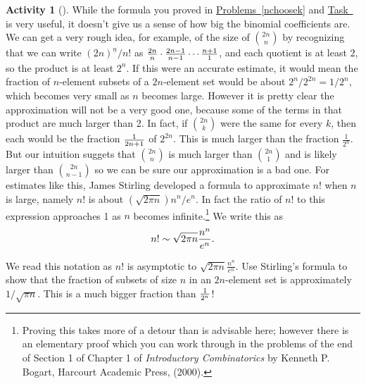 \documentclass[10pt,]{book}
\theoremstyle{plain}
\theoremstyle{definition}
\newtheorem{activity}[project]{Activity}
\numberwithin{equation}{chapter}
\begin{document}
\begin{activity}[]\label{Stirling_sapproximation}
While the formula you proved in \hyperref[nchoosek]{Problems~\ref{nchoosek}} and \hyperref[formulanchoosekfinal]{Task~} is very useful, it doesn't give us a sense of how big the binomial coefficients are. We can get a very rough idea, for example, of the size of \(2n\choose n\) by recognizing that we can write \((2n)^{\underline{n}}/n!\) as \({2n\over n}\cdot
{2n-1\over n-1}\cdots {n+1\over 1}\), and each quotient is at least \(2\), so the product is at least \(2^n\). If this were an accurate estimate, it would mean the fraction of \(n\)-element subsets of a \(2n\)-element set would be about \(2^n/2^{2n}=1/2^n\), which becomes very small as \(n\) becomes large. However it is pretty clear the approximation will not be a very good one, because some of the terms in that product are much larger than 2. In fact, if \(2n\choose k\) were the same for every \(k\), then each would be the fraction \(1\over 2n+1\) of \(2^{2n}\). This is much larger than the fraction \(\frac{1}{2^n}\). But our intuition suggets that \(\binom{2n}{n}\) is much larger than \(\binom{2n}{1}\) and is likely larger than \(\binom{2n}{n-1}\) so we can be sure our approximation is a bad one. For estimates like this, James Stirling developed a formula to approximate \(n!\) when \(n\) is large, namely \(n!\) is about \(\left(\sqrt{2\pi
n}\right){n^n/ e^n}\). In fact the ratio of \(n!\) to this expression approaches 1 as \(n\) becomes infinite.\footnote{Proving this takes more of a detour than is advisable here; however there is an elementary proof which you can work through in the problems of the end of Section 1 of Chapter 1 of \emph{Introductory Combinatorics} by Kenneth P. Bogart, Harcourt Academic Press, (2000).\label{fn-2}} We write this as%
\begin{equation*}
n!\sim \sqrt{2\pi
n}{n^n\over e^n}.
\end{equation*}
%
\par
We read this notation as \(n!\) is asymptotic to \(\sqrt{2\pi n}\frac{n^n}{e^n}\). Use Stirling's formula to show that the fraction of subsets of size \(n\) in an \(2n\)-element set is approximately \(1/\sqrt{\pi n}\). This is a much bigger fraction than \(1\over 2^n\)!%
\end{activity}
\typeout{************************************************}
\typeout{************************************************}
\end{document}
